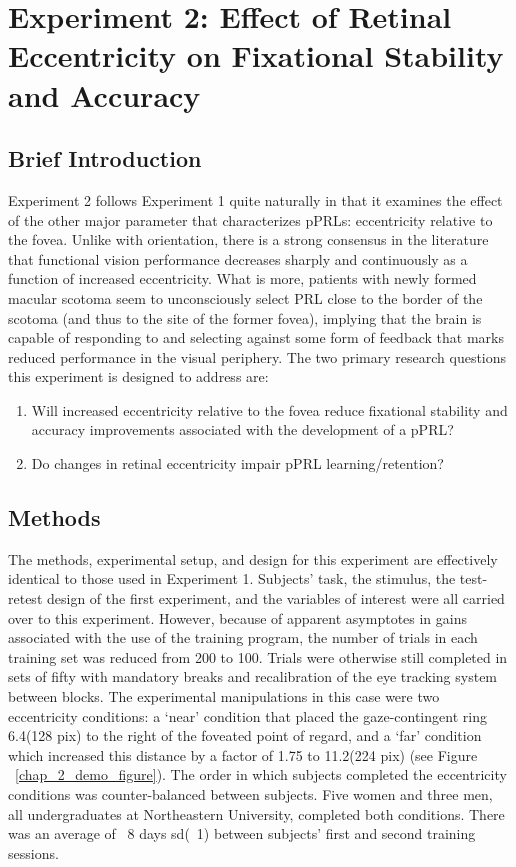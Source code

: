 
\chapter{Experiment 2: Effect of Retinal Eccentricity on Fixational Stability and Accuracy}

\section{Brief Introduction}

Experiment 2 follows Experiment 1 quite naturally in that it examines the effect of the other major parameter that characterizes pPRLs: eccentricity relative to the fovea. Unlike with orientation, there is a strong consensus in the literature that functional vision performance decreases sharply and continuously as a function of increased eccentricity\citep{carrasco_2001,whittaker_1988}. What is more, patients with newly formed macular scotoma seem to unconsciously select PRL close to the border of the scotoma\citep{cummings_1985,timberlake_1986} (and thus to the site of the former fovea), implying that the brain is capable of responding to and selecting against some form of feedback that marks reduced performance in the visual periphery. The two primary research questions this experiment is designed to address are:

\begin{enumerate}
\item Will increased eccentricity relative to the fovea reduce fixational stability and accuracy improvements associated with the development of a pPRL?
\item Do changes in retinal eccentricity impair pPRL learning/retention?
\end{enumerate}

\section{Methods}

The methods, experimental setup, and design for this experiment are effectively identical to those used in Experiment 1. Subjects' task, the stimulus, the test-retest design of the first experiment, and the variables of interest were all carried over to this experiment. However, because of apparent asymptotes in gains associated with the use of the training program, the number of trials in each training set was reduced from 200 to 100. Trials were otherwise still completed in sets of fifty with mandatory breaks and recalibration of the eye tracking system between blocks. The experimental manipulations in this case were two eccentricity conditions: a ‘near’ condition that placed the gaze-contingent ring 6.4\degree (128 pix) to the right of the foveated point of regard, and a ‘far’ condition which increased this distance by a factor of 1.75 to 11.2\degree (224 pix) (see Figure ~\ref{chap_2_demo_figure}). The order in which subjects completed the eccentricity conditions was counter-balanced between subjects. Five women and three men, all undergraduates at Northeastern University, completed both conditions. There was an average of ~8 days sd(~1) between subjects' first and second training sessions.

